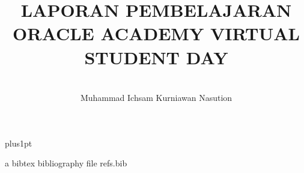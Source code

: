 \documentclass[12pt]{ociamthesis}  %
\title{\large LAPORAN PEMBELAJARAN ORACLE ACADEMY VIRTUAL STUDENT DAY  \\[3ex]     %
        \textit{} }   %
\author{ \\ Muhammad Ichsam Kurniawan Nasution  }        %
\begin{document}
\baselineskip=18pt plus1pt

\setcounter{secnumdepth}{3}
\setcounter{tocdepth}{3}
\maketitle                  %


\begin{romanpages}          %
\tableofcontents            %
\listoffigures
\listoftables           %
\end{romanpages}            %

 
 
 
 
 
 

%
%

 a bibtex bibliography file refs.bib
\end{document}

